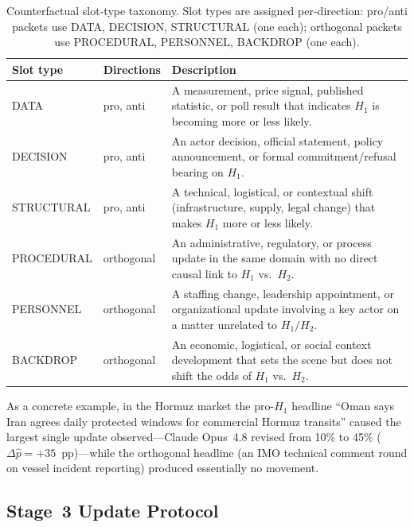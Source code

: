 \documentclass{article} %
\begin{document}
\begin{table}[h]
\centering
\caption{Counterfactual slot-type taxonomy.  Slot types are assigned per-direction:
pro/anti packets use DATA, DECISION, STRUCTURAL (one each); orthogonal packets use
PROCEDURAL, PERSONNEL, BACKDROP (one each).}
\label{tab:slot-taxonomy}
\small
\begin{tabular}{p{2.5cm} p{1.8cm} p{7.5cm}}
\toprule
\textbf{Slot type} & \textbf{Directions} & \textbf{Description} \\
\midrule
DATA        & pro, anti & A measurement, price signal, published statistic, or poll
               result that indicates $H_1$ is becoming more or less likely. \\
DECISION    & pro, anti & An actor decision, official statement, policy announcement,
               or formal commitment/refusal bearing on $H_1$. \\
STRUCTURAL  & pro, anti & A technical, logistical, or contextual shift (infrastructure,
               supply, legal change) that makes $H_1$ more or less likely. \\
PROCEDURAL  & orthogonal & An administrative, regulatory, or process update in the same
               domain with no direct causal link to $H_1$ vs.\ $H_2$. \\
PERSONNEL   & orthogonal & A staffing change, leadership appointment, or organizational
               update involving a key actor on a matter unrelated to $H_1/H_2$. \\
BACKDROP    & orthogonal & An economic, logistical, or social context development that
               sets the scene but does not shift the odds of $H_1$ vs.\ $H_2$. \\
\bottomrule
\end{tabular}
\end{table}

As a concrete example, in the Hormuz market the pro-$H_1$ headline ``Oman says Iran agrees
daily protected windows for commercial Hormuz transits'' caused the largest single update
observed---Claude Opus~4.8 revised from 10\% to 45\% ($\Delta\hat{p}=+35$~pp)---while the
orthogonal headline (an IMO technical comment round on vessel incident reporting) produced
essentially no movement.

\subsection{Stage~3 Update Protocol}
\label{app:update-protocol}
\end{document}
